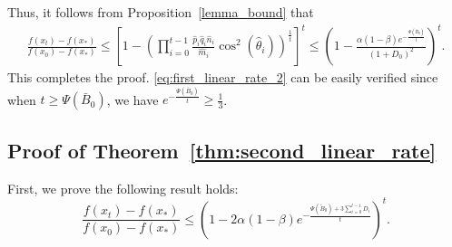 \documentclass[11pt,letterpaper]{article}
\newcommand\0{{\Vector{0}}}
\newcommand\1{{\Vector{1}}}
\numberwithin{assumption}{section}
\numberwithin{definition}{section}
\numberwithin{theorem}{section}
\numberwithin{remark}{section}
\begin{document}
    Thus, it follows from Proposition~\ref{lemma_bound} that 
    \begin{align*}
        \frac{f(x_{t}) - f(x_*)}{f(x_0) - f(x_*)} \leq \left[1 - \left(\prod_{i = 0}^{t-1} \frac{\hat{p}_i\hat{q}_i\hat{n}_i}{\hat{m}_i} \cos^2(\hat{\theta}_i)\right)^{\frac{1}{t}}\right]^{t} \leq \left(1 - \frac{\alpha(1 - \beta)e^{-\frac{\Psi(\bar{B}_0)}{t}}}{(1 + D_0)^2}\right)^{t}.
    \end{align*}
    This completes the proof. \eqref{eq:first_linear_rate_2} can be easily verified since when $t \geq \Psi(\bar{B}_0)$, we have $e^{-\frac{\Psi(\bar{B}_0)}{t}} \geq \frac{1}{3}$.

\subsection{Proof of Theorem~\ref{thm:second_linear_rate}}\label{proof_thm_second_linear}

    First, we prove the following result holds:
    \begin{equation}\label{proposition_3_1}
        \frac{f(x_t) - f(x_*)}{f(x_0) - f(x_*)} \leq \left(1 - 2\alpha(1 - \beta)e^{- \frac{\Psi(\tilde{B}_{0}) + 3\sum_{i = 0}^{t - 1}D_i}{t}} \right)^{t}.
    \end{equation}
\end{document}
